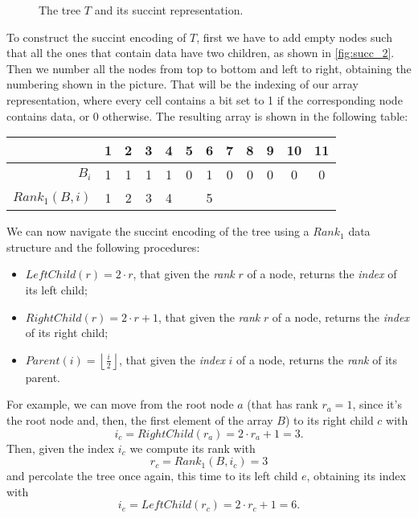 \begin{figure}[H]
\caption{The tree $T$ and its succint representation.}
\label{fig:succ_0}
\end{figure}

To construct the succint encoding of $T$, first we have to add empty nodes such
that all the ones that contain data have two children, as shown in
\autoref{fig:succ_2}. Then we number all the nodes from top to bottom and left
to right, obtaining the numbering shown in the picture. That will be the
indexing of our array representation, where every cell contains a bit set to 1
if the corresponding node contains data, or 0 otherwise. The resulting array is
shown in the following table:
%
\begin{center}
  \begin{tabular}{r|c|c|c|c|c|c|c|c|c|c|c}
                   & 1 & 2 & 3 & 4 & 5 & 6 & 7 & 8 & 9 & 10 & 11 \\ \hline
    $B_i$          & 1 & 1 & 1 & 1 & 0 & 1 & 0 & 0 & 0 &  0 &  0 \\
    $Rank_1(B, i)$ & 1 & 2 & 3 & 4 &   & 5 &   &   &   &    &    \\
  \end{tabular}
\end{center}

We can now navigate the succint encoding of the tree using a $Rank_1$ data
structure and the following procedures:
%
\begin{itemize}

  \item $LeftChild(r) = 2 \cdot r$, that given the \emph{rank} $r$ of a node, returns
  the \emph{index} of its left child;

  \item $RightChild(r) = 2 \cdot r + 1$, that given the \emph{rank} $r$ of a node,
  returns the \emph{index} of its right child;

  \item $Parent(i) = \left\lfloor \frac{i}{2} \right\rfloor$, that given the
  \emph{index} $i$ of a node, returns the \emph{rank} of its parent.

\end{itemize}

For example, we can move from the root node $a$ (that has rank $r_a = 1$, since
it's the root node and, then, the first element of the array $B$) to its right
child $c$ with $$i_c = RightChild(r_a) = 2 \cdot r_a + 1 = 3.$$ Then, given the
index $i_c$ we compute its rank with $$r_c = Rank_1(B, i_c) = 3$$ and percolate
the tree once again, this time to its left child $e$, obtaining its index with
$$i_e = LeftChild(r_c) = 2 \cdot r_c + 1 = 6.$$
